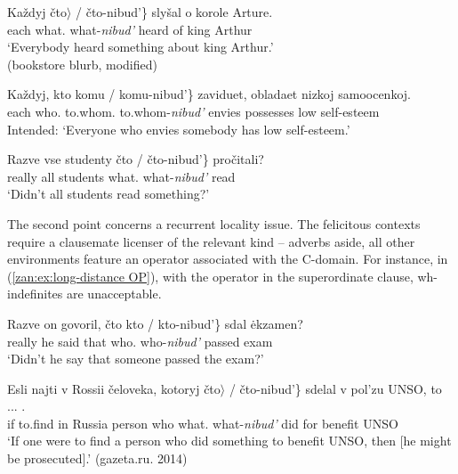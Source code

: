 \documentclass[output=paper,colorlinks,citecolor=brown]{langscibook}
\begin{document}
\ea \label{zan:ex:quantified contexts}
\ea
        \gll Každyj \minsp{\{$\langle $*} čto$\rangle$ / čto-nibud'\} slyšal o korole Arture. \\
     each {} what.{\INDF} {} what-\textit{nibud'} heard of king Arthur\\
        \glt `Everybody heard something about king Arthur.'\\ \hfill{(bookstore blurb, modified)}

\ex 
        \gll Každyj, kto \minsp{\{*} komu / komu-nibud'\} zaviduet, obladaet nizkoj samoocenkoj.\\
      each who.{\REL} {} to.whom.{\INDF} {} to.whom-\textit{nibud'} envies possesses low self-esteem\\
        \glt Intended: `Everyone who envies somebody has low self-esteem.'
\z
\z

\ea \label{zan:ex:Q with universal}
\gll Razve vse studenty  čto	/ čto-nibud'\}  pročitali?\\
really all students {} what.{\INDF} {} what-\textit{nibud'} read\\
\glt `Didn't all students read something?'
\z

\noindent The second point concerns a recurrent locality issue. The felicitous contexts require a clausemate licenser of the relevant kind -- adverbs aside, all other environments feature an operator associated with the C-domain. For instance, in (\ref{zan:ex:long-distance OP}), with the operator in the superordinate clause, wh-indefinites are unacceptable.  

\ea \label{zan:ex:long-distance OP}
\ea \gll  Razve on govoril, čto \minsp{\{*} kto / kto-nibud'\} sdal \.{e}kzamen? \\
really he said that {} who.{\INDF} {} who-\textit{nibud'} passed  exam\\
\glt `Didn't he say that someone passed the exam?'

\ex
\gll Esli najti v Rossii čeloveka, kotoryj  čto$\rangle$ / čto-nibud'\}  sdelal v pol'zu UNSO, to ... .\\
if to.find in Russia person who {} what.{\INDF} {} what-\textit{nibud'} did for benefit UNSO\\
\glt `If one were to find a person who did something to benefit UNSO, then [he might be prosecuted].' \hfill {(gazeta.ru. 2014)}
\z
\z 
\end{document}
